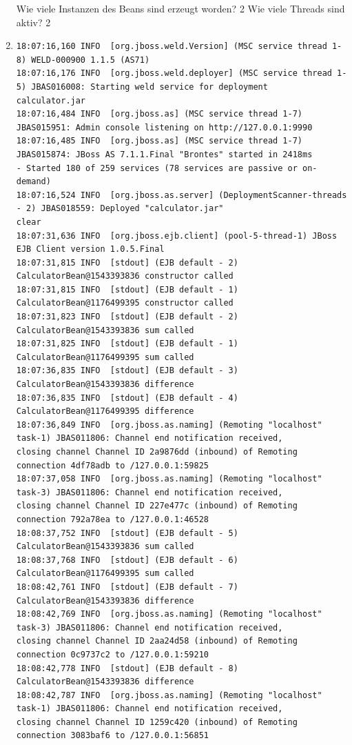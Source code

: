 \documentclass[a4paper,10pt]{scrreprt}
\begin{document}
\begin{enumerate}
Wie viele Instanzen des Beans sind erzeugt worden? {\color{red} 2}
Wie viele Threads sind aktiv? {\color{red} 2}
\item \begin{lstlisting}[language={}]
18:07:16,160 INFO  [org.jboss.weld.Version] (MSC service thread 1-8) WELD-000900 1.1.5 (AS71)
18:07:16,176 INFO  [org.jboss.weld.deployer] (MSC service thread 1-5) JBAS016008: Starting weld service for deployment 
calculator.jar
18:07:16,484 INFO  [org.jboss.as] (MSC service thread 1-7) JBAS015951: Admin console listening on http://127.0.0.1:9990
18:07:16,485 INFO  [org.jboss.as] (MSC service thread 1-7) JBAS015874: JBoss AS 7.1.1.Final "Brontes" started in 2418ms 
- Started 180 of 259 services (78 services are passive or on-demand)
18:07:16,524 INFO  [org.jboss.as.server] (DeploymentScanner-threads - 2) JBAS018559: Deployed "calculator.jar"
clear
18:07:31,636 INFO  [org.jboss.ejb.client] (pool-5-thread-1) JBoss EJB Client version 1.0.5.Final
18:07:31,815 INFO  [stdout] (EJB default - 2) CalculatorBean@1543393836 constructor called
18:07:31,815 INFO  [stdout] (EJB default - 1) CalculatorBean@1176499395 constructor called
18:07:31,823 INFO  [stdout] (EJB default - 2) CalculatorBean@1543393836 sum called
18:07:31,825 INFO  [stdout] (EJB default - 1) CalculatorBean@1176499395 sum called
18:07:36,835 INFO  [stdout] (EJB default - 3) CalculatorBean@1543393836 difference
18:07:36,835 INFO  [stdout] (EJB default - 4) CalculatorBean@1176499395 difference
18:07:36,849 INFO  [org.jboss.as.naming] (Remoting "localhost" task-1) JBAS011806: Channel end notification received, 
closing channel Channel ID 2a9876dd (inbound) of Remoting connection 4df78adb to /127.0.0.1:59825
18:07:37,058 INFO  [org.jboss.as.naming] (Remoting "localhost" task-3) JBAS011806: Channel end notification received, 
closing channel Channel ID 227e477c (inbound) of Remoting connection 792a78ea to /127.0.0.1:46528
18:08:37,752 INFO  [stdout] (EJB default - 5) CalculatorBean@1543393836 sum called
18:08:37,768 INFO  [stdout] (EJB default - 6) CalculatorBean@1176499395 sum called
18:08:42,761 INFO  [stdout] (EJB default - 7) CalculatorBean@1543393836 difference
18:08:42,769 INFO  [org.jboss.as.naming] (Remoting "localhost" task-3) JBAS011806: Channel end notification received, 
closing channel Channel ID 2aa24d58 (inbound) of Remoting connection 0c9737c2 to /127.0.0.1:59210
18:08:42,778 INFO  [stdout] (EJB default - 8) CalculatorBean@1543393836 difference
18:08:42,787 INFO  [org.jboss.as.naming] (Remoting "localhost" task-1) JBAS011806: Channel end notification received, 
closing channel Channel ID 1259c420 (inbound) of Remoting connection 3083baf6 to /127.0.0.1:56851



\end{lstlisting}
\end{enumerate}
\end{document}
